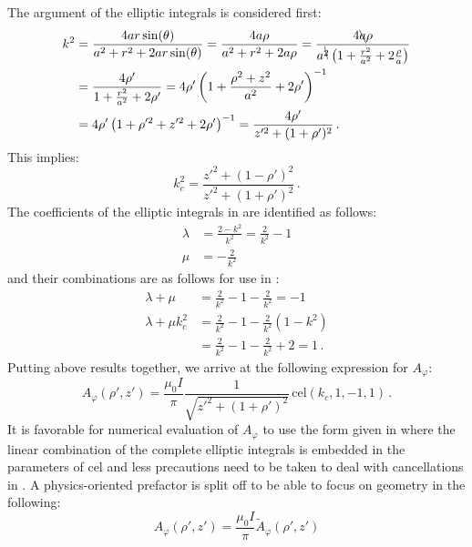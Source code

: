 The argument of the elliptic integrals is considered first:
\begin{align}
  k^2 &= \frac{4 a r \sin(\theta)}{a^2 + r^2 + 2 a r \sin(\theta)}
       = \frac{4 a \rho}{a^2 + r^2 + 2 a \rho}
       = \frac{4 \bcancel{a} \rho}{a^{\bcancel{2}} \left(1 + \frac{r^2}{a^2} + 2 \frac{\rho}{a} \right)} \nonumber \\
  ~   &= \frac{4 \rho'}{1 + \frac{r^2}{a^2} + 2 \rho'}
       = 4 \rho' \left( 1 + \frac{\rho^2 + z^2}{a^2} + 2 \rho' \right)^{-1} \nonumber \\
  ~   &= 4 \rho' \left( 1 + \rho'^{2} + z'^{2} + 2 \rho' \right)^{-1}
       = \frac{4 \rho'}{z'^2 + (1 + \rho')^2} \, . \label{eqn:kSq}
\end{align}
This implies:
\begin{equation}
  k_c^2 = \frac{z'^2 + (1 - \rho')^2}{z'^2 + (1 + \rho')^2} \, . \label{eqn:kCSq_general}
\end{equation}
The coefficients of the elliptic integrals in  are identified as follows:
\begin{align}
  \lambda &= \frac{2 - k^2}{k^2} = \frac{2}{k^2} - 1 \\
  \mu     &= -\frac{2}{k^2}
\end{align}
and their combinations are as follows for use in :
\begin{align}
  \lambda + \mu       &= \frac{2}{k^2} - 1 - \frac{2}{k^2}     = -1 \\
  \lambda + \mu k_c^2 &= \frac{2}{k^2} - 1 - \frac{2}{k^2} (1 - k^2) \nonumber \\
          ~           &= \frac{2}{k^2} - 1 - \frac{2}{k^2} + 2 =  1 \, .
\end{align}
Putting above results together, we arrive at the following expression for $A_\varphi$:
\begin{equation}
 A_\varphi(\rho', z') = \frac{\mu_0 I}{\pi}
                        \frac{1}{\sqrt{z'^2 + (1 + \rho')^2}} \,\mathrm{cel}(k_c, 1, -1, 1) \, . \label{eqn:cwl_A_phi_cel}
\end{equation}
It is favorable for numerical evaluation of $A_\varphi$ to use the form given in 
where the linear combination of the complete elliptic integrals is embedded in the parameters of cel
and less precautions need to be taken to deal with cancellations in .
A physics-oriented prefactor is split off to be able to focus on geometry in the following:
\begin{equation}
  A_\varphi(\rho', z') = \frac{\mu_0 I}{\pi} \tilde{A}_\varphi(\rho',z') \label{eqn:norm_A_phi}
\end{equation}
